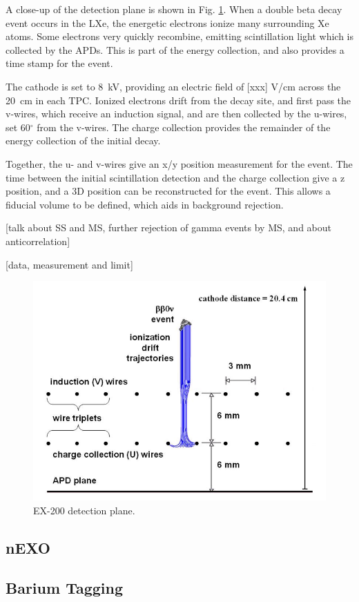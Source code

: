 A close-up of the detection plane is shown in Fig. \ref{fig:detectionplane}.  When a double beta decay event occurs in the LXe, the energetic electrons ionize many surrounding Xe atoms.  Some electrons very quickly recombine, emitting scintillation light which is collected by the APDs.  This is part of the energy collection, and also provides a time stamp for the event.  

The cathode is set to 8~kV, providing an electric field of [xxx] V/cm across the 20~cm in each TPC.  Ionized electrons drift from the decay site, and first pass the v-wires, which receive an induction signal, and are then collected by the u-wires, set {\color{red}60$^\circ$} from the v-wires.  The charge collection provides the remainder of the energy collection of the initial decay.

Together, the u- and v-wires give an x/y position measurement for the event.  The time between the initial scintillation detection and the charge collection give a z position, and a 3D position can be reconstructed for the event.  This allows a fiducial volume to be defined, which aids in background rejection.  

[talk about SS and MS, further rejection of gamma events by MS, and about anticorrelation]

[data, measurement and limit]

\begin{figure}[H]
	\centering
	\includegraphics[width=.7\textwidth]{figures/anodecathodedriftcharges.png}
	\caption{EX-200 detection plane.}
\label{fig:detectionplane}
\end{figure}

\subsection{nEXO}

\subsection{Barium Tagging}

